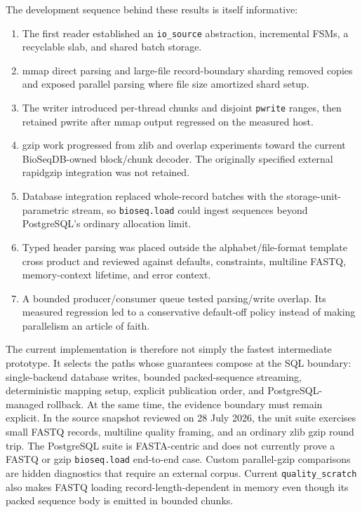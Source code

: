 The development sequence behind these results is itself informative:

\begin{enumerate}
    \item The first reader established an \texttt{io\_source} abstraction,
    incremental FSMs, a recyclable slab, and shared batch storage.
    \item mmap direct parsing and large-file record-boundary sharding removed
    copies and exposed parallel parsing where file size amortized shard setup.
    \item The writer introduced per-thread chunks and disjoint
    \texttt{pwrite} ranges, then retained pwrite after mmap output regressed on
    the measured host.
    \item gzip work progressed from zlib and overlap experiments toward the
    current BioSeqDB-owned block/chunk decoder. The originally specified
    external rapidgzip integration was not retained.
    \item Database integration replaced whole-record batches with the
    storage-unit-parametric stream, so \texttt{bioseq.load} could ingest
    sequences beyond PostgreSQL's ordinary allocation limit.
    \item Typed header parsing was placed outside the alphabet/file-format
    template cross product and reviewed against defaults, constraints,
    multiline FASTQ, memory-context lifetime, and error context.
    \item A bounded producer/consumer queue tested parsing/write overlap.  Its
    measured regression led to a conservative default-off policy instead of
    making parallelism an article of faith.
\end{enumerate}

The current implementation is therefore not simply the fastest intermediate
prototype. It selects the paths whose guarantees compose at the SQL boundary:
single-backend database writes, bounded packed-sequence streaming, deterministic
mapping setup, explicit publication order, and PostgreSQL-managed rollback. At the
same time, the evidence boundary must remain explicit. In the source snapshot
reviewed on 28 July 2026, the
 unit suite exercises small FASTQ records,
multiline quality framing, and an ordinary zlib gzip round trip. The
PostgreSQL  suite is FASTA-centric
and does not currently prove a FASTQ or gzip
\texttt{bioseq.load} end-to-end case. Custom parallel-gzip comparisons are
hidden diagnostics that require an external corpus.
Current \texttt{quality\_scratch} also makes FASTQ loading
record-length-dependent in memory even though its packed sequence body is
emitted in bounded chunks.

